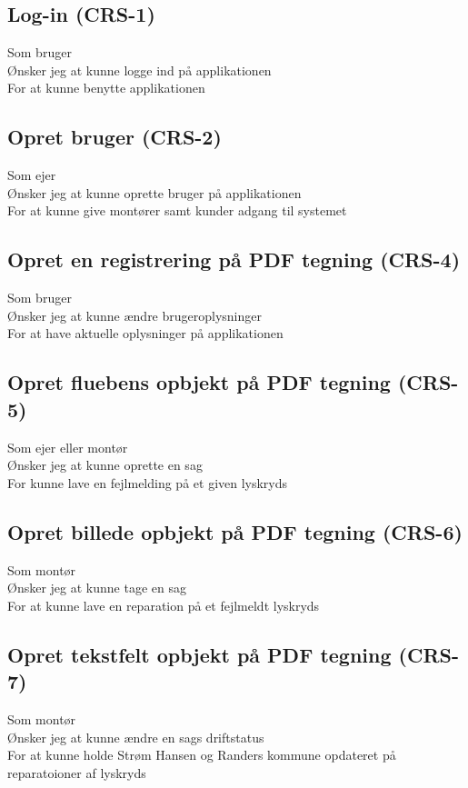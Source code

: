 	\subsection*{Log-in (CRS-1)}
	Som bruger\\
	Ønsker jeg at kunne logge ind på applikationen\\
	For at kunne benytte applikationen
	
	\subsection*{Opret bruger (CRS-2)}
	Som ejer\\
	Ønsker jeg at kunne oprette bruger på applikationen\\
	For at kunne give montører samt kunder adgang til systemet
	
	\subsection*{Opret en registrering på PDF tegning (CRS-4)}
	Som bruger\\
	Ønsker jeg at kunne ændre brugeroplysninger\\
	For at have aktuelle oplysninger på applikationen
	
	\subsection*{Opret fluebens opbjekt på PDF tegning (CRS-5)}
	Som ejer eller montør\\
	Ønsker jeg at kunne oprette en sag\\
	For kunne lave en fejlmelding på et given lyskryds

	\subsection*{Opret billede opbjekt på PDF tegning (CRS-6)}
	Som montør\\
	Ønsker jeg at kunne tage en sag\\
	For at kunne lave en reparation på et fejlmeldt lyskryds
	
	\subsection*{Opret tekstfelt opbjekt på PDF tegning (CRS-7)}
	Som montør\\
	Ønsker jeg at kunne ændre en sags driftstatus\\
	For at kunne holde Strøm Hansen og Randers kommune opdateret på reparatoioner af lyskryds
	
